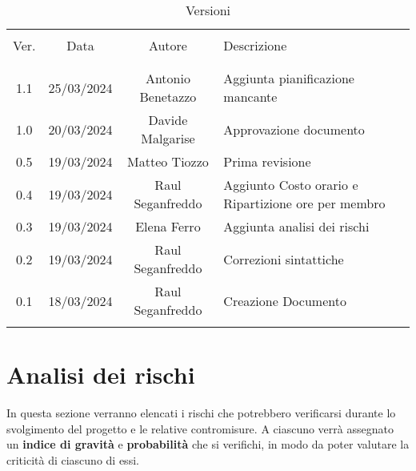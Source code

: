 \documentclass[italian,12pt]{article} %
\begin{document}


\newpage



\begin{table}[!h]
	\caption{Versioni}
	\begin{center}
		\begin{tabular}{ c c c p{9cm} }
			\hline                                                                                      \\[-2ex]
			Ver. & Data       & Autore           & Descrizione                                          \\
			\\[-2ex] \hline \\[-1.5ex]
			1.1  & 25/03/2024 & Antonio Benetazzo & Aggiunta pianificazione mancante                    \\
			1.0  & 20/03/2024 & Davide Malgarise  & Approvazione documento                              \\
			0.5  & 19/03/2024 & Matteo Tiozzo     & Prima revisione                                     \\
			0.4  & 19/03/2024 & Raul Seganfreddo  & Aggiunto Costo orario e Ripartizione ore per membro \\
			0.3  & 19/03/2024 & Elena Ferro       & Aggiunta analisi dei rischi                         \\
			0.2  & 19/03/2024 & Raul Seganfreddo  & Correzioni sintattiche                              \\
			0.1  & 18/03/2024 & Raul Seganfreddo  & Creazione Documento                                 \\
			\\[-1.5ex] \hline
		\end{tabular}
	\end{center}
\end{table}

\newpage

\tableofcontents

\newpage

\section{Analisi dei rischi}
In questa sezione verranno elencati i rischi che potrebbero verificarsi durante lo svolgimento del progetto e le relative contromisure.
A ciascuno verrà assegnato un \textbf{indice di gravità} e \textbf{probabilità} che si verifichi, in modo da poter valutare la criticità di ciascuno di essi.
\end{document}
